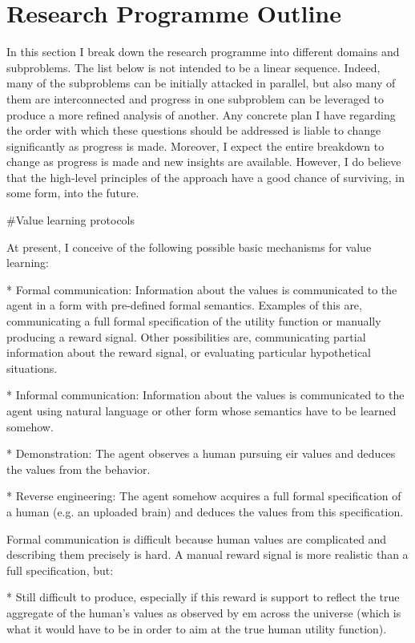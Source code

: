 \documentclass[a4paper]{article}
\begin{document}
\section{Research Programme Outline}

In this section I break down the research programme into different domains and subproblems. The list below is not intended to be a linear sequence. Indeed, many of the subproblems can be initially attacked in parallel, but also many of them are interconnected and progress in one subproblem can be leveraged to produce a more refined analysis of another. Any concrete plan I have regarding the order with which these questions should be addressed is liable to change significantly as progress is made. Moreover, I expect the entire breakdown to change as progress is made and new insights are available. However, I do believe that the high-level principles of the approach have a good chance of surviving, in some form, into the future.

\#Value learning protocols

At present, I conceive of the following possible basic mechanisms for value learning:

* Formal communication: Information about the values is communicated to the agent in a form with pre-defined formal semantics. Examples of this are, communicating a full formal specification of the utility function or manually producing a reward signal. Other possibilities are, communicating partial information about the reward signal, or evaluating particular hypothetical situations.

* Informal communication: Information about the values is communicated to the agent using natural language or other form whose semantics have to be learned somehow.

* Demonstration: The agent observes a human pursuing eir values and deduces the values from the behavior.

* Reverse engineering: The agent somehow acquires a full formal specification of a human (e.g. an uploaded brain) and deduces the values from this specification.

Formal communication is difficult because human values are complicated and describing them precisely is hard. A manual reward signal is more realistic than a full specification, but:

* Still difficult to produce, especially if this reward is support to reflect the true aggregate of the human's values as observed by em across the universe (which is what it would have to be in order to aim at the true human utility function).
\end{document}
